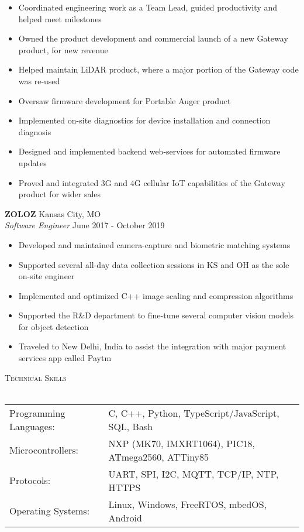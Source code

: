 \documentclass[a4paper]{article}
\newcommand{\lineunder} {
    \vspace*{-8pt} \\
    \hspace*{-18pt} \hrulefill \\
}
\newcommand{\header} [1] {
    {\hspace*{-18pt}\vspace*{6pt} \textsc{#1}}
    \vspace*{-6pt} \lineunder
}
\begin{document}
\begin{itemize} \itemsep 1pt
	\item Coordinated engineering work as a Team Lead, guided productivity and helped meet milestones
	\item Owned the product development and commercial launch of a new Gateway product, for new revenue
	\item Helped maintain LiDAR product, where a major portion of the Gateway code was re-used
	\item Oversaw firmware development for Portable Auger product
	\item Implemented on-site diagnostics for device installation and connection diagnosis
	\item Designed and implemented backend web-services for automated firmware updates
	\item Proved and integrated 3G and 4G cellular IoT capabilities of the Gateway product for wider sales
\end{itemize}
\textbf{ZOLOZ} \hfill Kansas City, MO\\
\textit{Software Engineer} \hfill June 2017 - October 2019\\
\vspace{-1mm}
\begin{itemize} \itemsep 1pt
	\item Developed and maintained camera-capture and biometric matching systems
	\item Supported several all-day data collection sessions in KS and OH as the sole on-site engineer
	\item Implemented and optimized C++ image scaling and compression algorithms
	\item Supported the R\&D department to fine-tune several computer vision models for object detection
	\item Traveled to New Delhi, India to assist the integration with major payment services app called Paytm
\end{itemize}

\header{Technical Skills}
\vspace{2mm}
\begin{tabular}{ l l }
	Programming Languages: & C, C++, Python, TypeScript/JavaScript, SQL, Bash                            \\
    Microcontrollers:      & NXP (MK70, IMXRT1064), PIC18, ATmega2560, ATTiny85        \\
    Protocols:             & UART, SPI, I2C, MQTT, TCP/IP, NTP, HTTPS \\
    Operating Systems:     & Linux, Windows, FreeRTOS, mbedOS, Android \\
\end{tabular}
\vspace{5mm}
\end{document}
